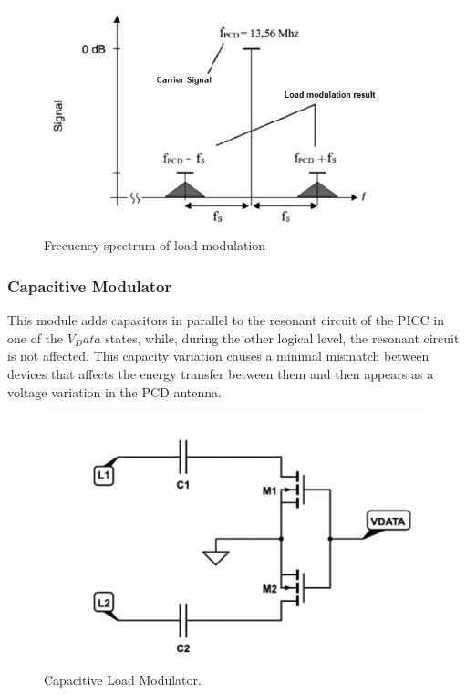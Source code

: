 \documentclass[a4paper, 10pt, conference]{ieeeconf}      %
\begin{document}
\begin{figure}[H]
\centering
\includegraphics[scale=0.5]{Images/ImagenesTesina/Antecedentes/Modulacion_Carga_2.JPG}
\caption{Frecuency spectrum of load modulation }
\label{fig:Mod_carg}
\end{figure}

\subsubsection{Capacitive Modulator}

This module adds capacitors in parallel to the resonant circuit of the PICC in one of the $V_Data$ states, while, during the other logical level, the resonant circuit is not affected. This capacity variation causes a minimal mismatch between devices that affects the energy transfer between them and then appears as a voltage variation in the PCD antenna.
\begin{figure}[H]
\centering
\includegraphics[scale=0.5]{Images/ImagenesTesina/Antecedentes/Modulacion_Carga_Cap.JPG}
\caption{Capacitive Load Modulator.}
\label{fig:Mod_carg_cap}
\end{figure}
\end{document}
